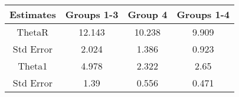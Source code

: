 \begin{tabular}{cccc}
\hline
Estimates & Groups 1-3 & Group 4 & Groups 1-4 \\
\hline
ThetaR & 12.143 & 10.238 & 9.909 \\
Std Error & 2.024 & 1.386 & 0.923 \\
Theta1 & 4.978 & 2.322 & 2.65 \\
Std Error & 1.39 & 0.556 & 0.471 \\
\hline
\end{tabular}
